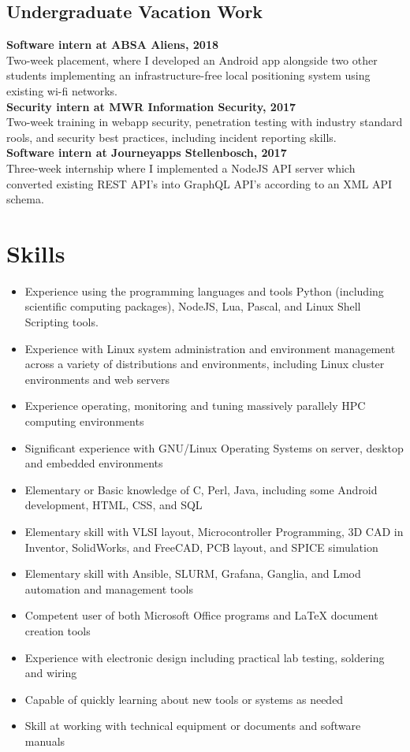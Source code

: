 \documentclass[10pt,a4paper,notitlepage]{article}
\begin{document}
\subsection*{Undergraduate Vacation Work}
\begin{spacing}{1.1}
\textbf{Software intern at ABSA Aliens, 2018}\\
Two-week placement, where I developed an Android app alongside two other students implementing an
infrastructure-free local positioning system using existing wi-fi networks. 
    \vspace*{0.5em}\\
\textbf{Security intern at MWR Information Security, 2017}\\
Two-week training in webapp security, penetration testing with industry standard rools, and security
best practices, including incident reporting skills.
    \vspace*{0.5em}\\
\textbf{Software intern at Journeyapps Stellenbosch, 2017}\\
Three-week internship where I implemented a NodeJS API server which converted existing REST API's
into GraphQL API's according to an XML API schema.
\end{spacing}

\section*{Skills}
\begin{itemize}[noitemsep]
	\setlength\itemsep{0.02em}
    \item Experience using the programming languages and tools Python (including scientific computing packages), NodeJS, Lua, Pascal, and Linux Shell Scripting tools.
    \item Experience with Linux system administration and environment management across a variety of distributions and environments, including Linux cluster environments and web servers
    \item Experience operating, monitoring and tuning massively parallely HPC computing environments
    \item Significant experience with GNU/Linux Operating Systems on server, desktop and embedded environments
    \item Elementary or Basic knowledge of C, Perl, Java, including some Android development, HTML, CSS, and SQL
    \item Elementary skill with VLSI layout, Microcontroller Programming, 3D CAD in Inventor, SolidWorks, and FreeCAD, PCB layout, and SPICE simulation
    \item Elementary skill with Ansible, SLURM, Grafana, Ganglia, and Lmod automation and management tools
    \item Competent user of both Microsoft Office programs and LaTeX document creation tools
    \item Experience with electronic design including practical lab testing, soldering and wiring
    \item Capable of quickly learning about new tools or systems as needed
    \item Skill at working with technical equipment or documents and software manuals
\end{itemize}
\end{document}
